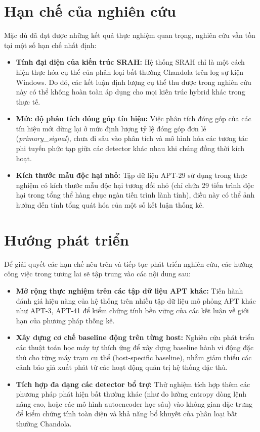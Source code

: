 \documentclass[../main.tex]{subfiles}
\begin{document}
\section{Hạn chế của nghiên cứu}
\label{section:conclusion.2}

Mặc dù đã đạt được những kết quả thực nghiệm quan trọng, nghiên cứu vẫn tồn tại một số hạn chế nhất định:
\begin{itemize}
    \item \textbf{Tính đại diện của kiến trúc SRAH:} Hệ thống SRAH chỉ là một cách hiện thực hóa cụ thể của phân loại bất thường Chandola trên log sự kiện Windows. Do đó, các kết luận định lượng cụ thể thu được trong nghiên cứu này có thể không hoàn toàn áp dụng cho mọi kiến trúc hybrid khác trong thực tế.
    \item \textbf{Mức độ phân tích đóng góp tín hiệu:} Việc phân tích đóng góp của các tín hiệu mới dừng lại ở mức định lượng tỷ lệ đóng góp đơn lẻ (\textit{primary\_signal}), chưa đi sâu vào phân tích và mô hình hóa các tương tác phi tuyến phức tạp giữa các detector khác nhau khi chúng đồng thời kích hoạt.
    \item \textbf{Kích thước mẫu độc hại nhỏ:} Tập dữ liệu APT-29 sử dụng trong thực nghiệm có kích thước mẫu độc hại tương đối nhỏ (chỉ chứa 29 tiến trình độc hại trong tổng thể hàng chục ngàn tiến trình lành tính), điều này có thể ảnh hưởng đến tính tổng quát hóa của một số kết luận thống kê.
\end{itemize}

\section{Hướng phát triển}
\label{section:conclusion.3}

Để giải quyết các hạn chế nêu trên và tiếp tục phát triển nghiên cứu, các hướng công việc trong tương lai sẽ tập trung vào các nội dung sau:
\begin{itemize}
    \item \textbf{Mở rộng thực nghiệm trên các tập dữ liệu APT khác:} Tiến hành đánh giá hiệu năng của hệ thống trên nhiều tập dữ liệu mô phỏng APT khác như APT-3, APT-41 để kiểm chứng tính bền vững của các kết luận về giới hạn của phương pháp thống kê.
    \item \textbf{Xây dựng cơ chế baseline động trên từng host:} Nghiên cứu phát triển các thuật toán học máy tự thích ứng để xây dựng baseline hành vi động đặc thù cho từng máy trạm cụ thể (host-specific baseline), nhằm giảm thiểu các cảnh báo giả xuất phát từ các hoạt động quản trị hệ thống đặc thù.
    \item \textbf{Tích hợp đa dạng các detector bổ trợ:} Thử nghiệm tích hợp thêm các phương pháp phát hiện bất thường khác (như đo lường entropy dòng lệnh nâng cao, hoặc các mô hình autoencoder học sâu) vào không gian đặc trưng để kiểm chứng tính toàn diện và khả năng bổ khuyết của phân loại bất thường Chandola.
\end{itemize}
\end{document}
